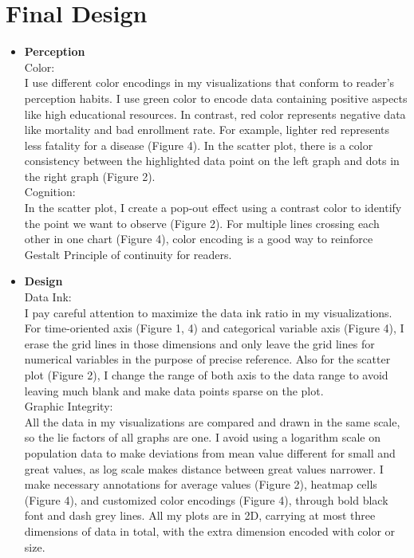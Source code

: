 \documentclass{article}
\begin{document}
\newpage
\section{Final Design}

\begin{itemize}
    \item \textbf{Perception} \\
    Color: \\
    I use different color encodings in my visualizations that conform to reader's perception habits. I use green color to encode data containing positive aspects like high educational resources. In contrast, red color represents negative data like mortality and bad enrollment rate. For example, lighter red represents less fatality for a disease (Figure 4). In the scatter plot, there is a color consistency between the highlighted data point on the left graph and dots in the right graph (Figure 2). \\ 
    \noindent
    Cognition: \\
    In the scatter plot, I create a pop-out effect using a contrast color to identify the point we want to observe (Figure 2). For multiple lines crossing each other in one chart (Figure 4), color encoding is a good way to reinforce Gestalt Principle of continuity for readers.
    \item \textbf{Design} \\
    Data Ink: \\
    I pay careful attention to maximize the data ink ratio in my visualizations. For time-oriented axis (Figure 1, 4) and categorical variable axis (Figure 4), I erase the grid lines in those dimensions and only leave the grid lines for numerical variables in the purpose of precise reference. Also for the scatter plot (Figure 2), I change the range of both axis to the data range to avoid leaving much blank and make data points sparse on the plot. \\
    \noindent
    Graphic Integrity: \\ 
    All the data in my visualizations are compared and drawn in the same scale, so the lie factors of all graphs are one. I avoid using a logarithm scale on population data to make deviations from mean value different for small and great values, as log scale makes distance between great values narrower. I make necessary annotations for average values (Figure 2), heatmap cells (Figure 4), and customized color encodings (Figure 4), through bold black font and dash grey lines. All my plots are in 2D, carrying at most three dimensions of data in total, with the extra dimension encoded with color or size. 

\end{itemize}
\end{document}
